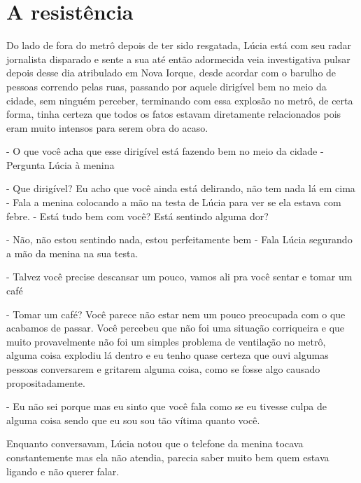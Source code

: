 
\chapter{A resistência}
    



Do lado de fora do metrô depois de ter sido resgatada, Lúcia está com seu radar jornalista disparado e sente a sua até então adormecida veia investigativa pulsar depois desse dia atribulado em Nova Iorque, desde acordar com o barulho de pessoas correndo pelas ruas, passando por aquele dirigível bem no meio da cidade, sem ninguém perceber, terminando com essa explosão no metrô, de certa forma, tinha certeza que todos os fatos estavam diretamente relacionados pois eram muito intensos para serem obra do acaso.

- O que você acha que esse dirigível está fazendo bem no meio da cidade - Pergunta Lúcia à menina

- Que dirigível? Eu acho que você ainda está delirando, não tem nada lá em cima - Fala a menina colocando a mão na testa de Lúcia para ver se ela estava com febre. - Está tudo bem com você? Está sentindo alguma dor?

- Não, não estou sentindo nada, estou perfeitamente bem - Fala Lúcia segurando a mão da menina na sua testa.

- Talvez você precise descansar um pouco, vamos ali  pra você sentar e tomar um café

- Tomar um café? Você parece não estar nem um pouco preocupada com o que acabamos de passar. Você percebeu que não foi uma situação corriqueira e que muito provavelmente não foi um simples problema de ventilação no metrô, alguma coisa explodiu lá dentro e eu tenho quase certeza que ouvi algumas pessoas conversarem e gritarem alguma coisa, como se fosse algo causado propositadamente.

- Eu não sei porque mas eu sinto que você fala como se eu tivesse culpa de alguma coisa sendo que eu sou sou tão vítima quanto você.


Enquanto conversavam, Lúcia notou que o telefone da menina tocava constantemente mas ela não atendia, parecia saber muito bem quem estava ligando e não querer falar.

